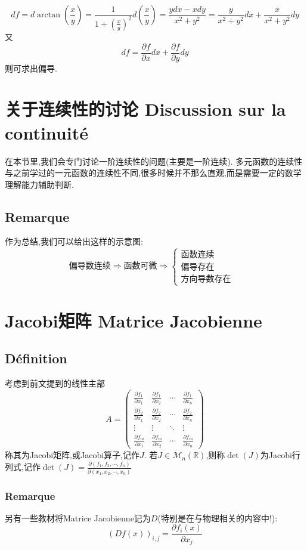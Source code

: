 \documentclass[12pt, a4paper, oneside]{ctexbook}
\newcommand{\R }{\mathbb{R}}%
\begin{document}
    $$df=d \arctan(\frac{x}{y})=\frac{1}{1+(\frac{x}{y})^2}d(\frac{x}{y})=\frac{ydx-xdy}{x^2+y^2}=\frac{y}{x^2+y^2}dx+\frac{x}{x^2+y^2}dy$$
    又
    $$df=\frac{\partial f}{\partial x}dx+ \frac{\partial f}{\partial y}dy$$
    则可求出偏导.
\section{关于连续性的讨论 Discussion sur la continuité}

在本节里,我们会专门讨论一阶连续性的问题(主要是一阶连续).
多元函数的连续性与之前学过的一元函数的连续性不同,很多时候并不那么直观,而是需要一定的数学理解能力辅助判断.

\subsection{Remarque}
  作为总结,我们可以给出这样的示意图:
  $$
  \text{偏导数连续}\Rightarrow\text{函数可微}\Rightarrow
  \begin{cases}
    \text{函数连续} & \\
    \text{偏导存在} & \\
    \text{方向导数存在}
    \end{cases}
  $$

\section{Jacobi矩阵 Matrice Jacobienne}
    \subsection{Définition}
    考虑到前文提到的线性主部
    $$
     A=\begin{pmatrix}
      \frac{\partial f_1}{\partial x_1}&\frac{\partial f_1}{\partial x_2}  &\cdots  &\frac{\partial f_1}{\partial x_n} \\
      \frac{\partial f_2}{\partial x_1}&\frac{\partial f_2}{\partial x_2}  & \cdots & \frac{\partial f_2}{\partial x_n}\\ 
      \vdots& \vdots & \ddots  & \vdots\\
      \frac{\partial f_m}{\partial x_1}&\frac{\partial f_m}{\partial x_2} &\cdots & \frac{\partial f_m}{\partial x_n} 
     \end{pmatrix}
    $$
    称其为Jacobi矩阵,或Jacobi算子,记作$J$.
    若$J\in\mathcal{M}_n(\R) $,则称$\det(J)$为Jacobi行列式,记作$\det(J)=\frac{\partial(f_1,f_2,\cdots,f_n)}{\partial(x_1,x_2,\cdots,x_n)}$
    \subsubsection{Remarque}
    另有一些教材将Matrice Jacobienne记为$D$(特别是在与物理相关的内容中!):
    $$
     (Df(x))_{i,j}=\frac{\partial f_i(x)}{\partial x_j}
    $$
\end{document}
